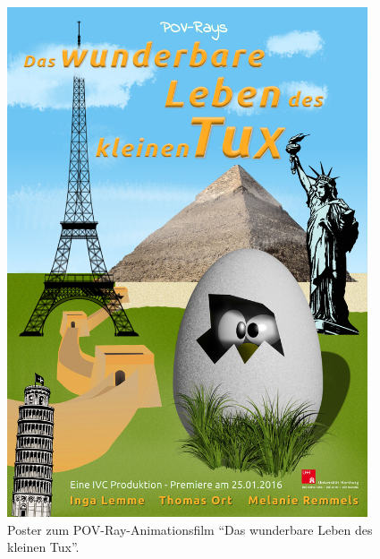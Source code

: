 \documentclass[11pt,parskip]{scrartcl}
\begin{document}
\newpage


\begin{figure}[htbp]
  \centering
  \includegraphics[width=0.95\textwidth]{../poster/filmposter_final.jpg}
  \caption{
    Poster zum POV-Ray-Animationsfilm \enquote{Das wunderbare Leben des kleinen
      Tux}.
  }
  \label{fig:poster}
\end{figure}


\newpage




\end{document}
